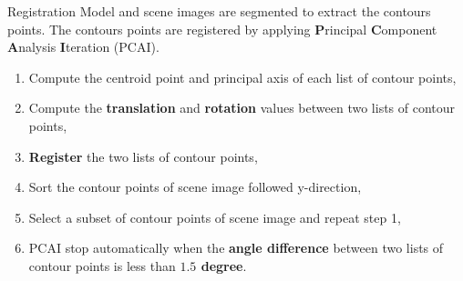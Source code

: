 \documentclass{LaBRI_poster}
\begin{document}
\begin{frame}[t]
\begin{columns}[t]
\begin{column}{\twocolwidth}
\vspace{5pt}

\begin{block}{Registration}
Model and scene images are segmented to extract the contours points. The contours points are registered by applying \textbf{P}rincipal \textbf{C}omponent \textbf{A}nalysis \cite{jolliffe2002principal} \textbf{I}teration (PCAI).
 \begin{enumerate}[\hspace{30pt}1.]
    		\item Compute the centroid point and principal axis of each list of contour points,
    		\item Compute the \textbf{translation} and \textbf{rotation} values between two lists of contour points,
    		\item \textbf{Register} the two lists of contour points,
    		\item Sort the contour points of scene image followed y-direction,
    		\item Select a subset of contour points of scene image and repeat step 1,
    		\item PCAI stop automatically when the \textbf{angle difference} between two 
    	lists of contour points is less than \textbf{$1.5$ degree}.
    \end{enumerate}
\end{block}

\vspace{5pt}


\end{column}
\end{columns}
\end{frame}
\end{document}
